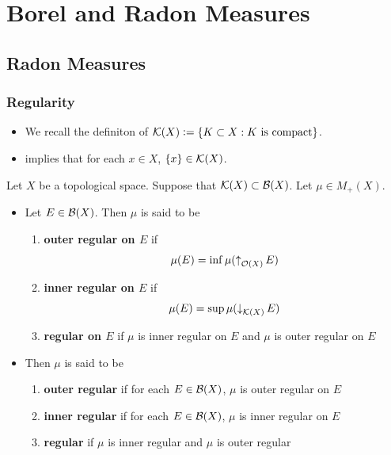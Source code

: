 \documentclass{book}
\begin{document}
	
	
	
	
	
	

	
	
	
	\newpage
	\chapter{Borel and Radon Measures}
	
	\section{Radon Measures}
	
	\subsection{Regularity}
	
	\begin{note}
		\begin{itemize}
			\item We recall the definiton of $\mathcal{K}(X) \vcentcolon= \{K \subset X: \text{$K$ is compact}\}$. 
			\item {} implies that for each $x \in X$, $\{x\} \in \mathcal{K}(X)$.
		\end{itemize}
	\end{note}
	
	\begin{defn}  
	Let $X$ be a topological space. Suppose that $\mathcal{K}(X) \subset \mathcal{B}(X)$. Let $\mu \in M_+(X)$.
	\begin{itemize}
		\item Let $E \in \mathcal{B}(X)$. 
		Then $\mu$ is said to be 
		\begin{enumerate}
			\item \textbf{outer regular on $E$} if
			$$\mu(E) = \inf \mu (\operatorname{\uparrow}_{\mathcal{O}(X)} E) $$
			\item \textbf{inner regular on $E$} if
			$$\mu(E) = \sup \mu (\operatorname{\downarrow}_{\mathcal{K}(X)} E) $$
			\item \textbf{regular on $E$} if $\mu$ is inner regular on $E$ and $\mu$ is outer regular on $E$
		\end{enumerate}
		\item Then $\mu$ is said to be 
		\begin{enumerate}
			\item  \textbf{outer regular} if for each $E \in \mathcal{B}(X)$, $\mu$ is outer regular on $E$
			\item  \textbf{inner regular} if for each $E \in \mathcal{B}(X)$, $\mu$ is inner regular on $E$
			\item  \textbf{regular} if $\mu$ is inner regular and $\mu$ is outer regular
		\end{enumerate}
	\end{itemize}
	\end{defn}
	
\end{document}
